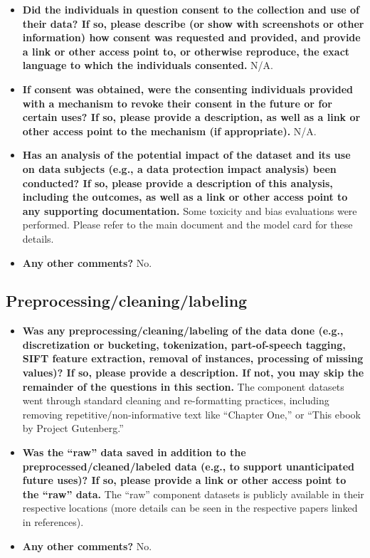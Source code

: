 \documentclass[11pt]{article}
\begin{document}
\begin{itemize}
    \item \textbf{Did the individuals in question consent to the collection and use of their data? If so, please describe (or show with screenshots or other information) how consent was requested and provided, and provide a link or other access point to, or otherwise reproduce, the exact language to which the individuals consented.} N/A.
    \item \textbf{If consent was obtained, were the consenting individuals provided with a mechanism to revoke their consent in the future or for certain uses? If so, please provide a description, as well as a link or other access point to the mechanism (if appropriate).} N/A.
    \item \textbf{Has an analysis of the potential impact of the dataset and its use on data subjects (e.g., a data protection impact analysis) been conducted? If so, please provide a description of this analysis, including the outcomes, as well as a link or other access point to any supporting documentation.} Some toxicity and bias evaluations were performed. Please refer to the main document and the model card for these details.
    \item \textbf{Any other comments?} No.
\end{itemize}

\subsection{Preprocessing/cleaning/labeling}
\begin{itemize}
    \item \textbf{Was any preprocessing/cleaning/labeling of the data done (e.g., discretization or bucketing, tokenization, part-of-speech tagging, SIFT feature extraction, removal of instances, processing of missing values)? If so, please provide a description. If not, you may skip the remainder of the questions in this section.} The component datasets went through standard cleaning and re-formatting practices, including removing repetitive/non-informative text like ``Chapter One,'' or ``This ebook by Project Gutenberg.''
    \item \textbf{Was the ``raw'' data saved in addition to the preprocessed/cleaned/labeled data (e.g., to support unanticipated future uses)? If so, please provide a link or other access point to the ``raw'' data.} The ``raw'' component datasets is publicly available in their respective locations (more details can be seen in the respective papers linked in references).
    \item \textbf{Any other comments?} No.
\end{itemize}
\end{document}
